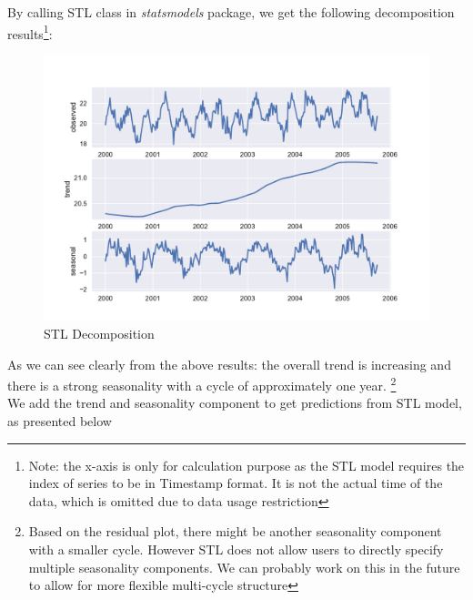 \documentclass[letterpaper,12pt]{article}
\begin{document}
By calling STL class in \emph{statsmodels} package, we get the following decomposition results\footnote{Note: the x-axis is only for calculation purpose as the STL model requires the index of series to be in Timestamp format. It is not the actual time of the data, which is omitted due to data usage restriction}:
\begin{figure}[H]
		\centering
	\caption{STL Decomposition}
\includegraphics[width=\linewidth]{decompose.pdf}
\end{figure}

As we can see clearly from the above results: the overall trend is increasing and there is a strong seasonality with a cycle of approximately one year. \footnote{Based on the residual plot, there might be another seasonality component with a smaller cycle. However STL does not allow users to directly specify multiple seasonality components. We can probably work on this in the future to allow for more flexible multi-cycle structure} \\

We add the trend and seasonality component to get predictions from STL model, as presented below
\end{document}
